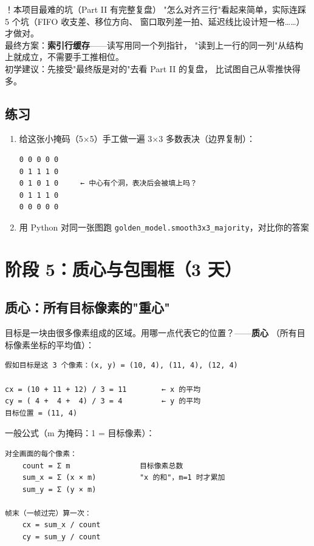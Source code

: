 \documentclass[11pt]{ctexart}
\newcommand{\code}[1]{\texttt{#1}}
\begin{document}
\begin{warnbox}{！本项目最难的坑（Part II 有完整复盘）}
"怎么对齐三行"看起来简单，实际连踩 5 个坑（FIFO 收支差、移位方向、
窗口取列差一拍、延迟线比设计短一格……）才做对。\\[4pt]
最终方案：\textbf{索引行缓存}——读写用同一个列指针，
"读到上一行的同一列"从结构上就成立，不需要手工推相位。\\[4pt]
初学建议：先接受"最终版是对的"去看 Part II 的复盘，
比试图自己从零推快得多。
\end{warnbox}

\subsection{练习}

\begin{enumerate}
  \item 给这张小掩码（5×5）手工做一遍 3×3 多数表决（边界复制）：
\begin{Verbatim}[fontsize=\small]
0 0 0 0 0
0 1 1 1 0
0 1 0 1 0     ← 中心有个洞，表决后会被填上吗？
0 1 1 1 0
0 0 0 0 0
\end{Verbatim}
  \item 用 Python 对同一张图跑 \code{golden\_model.smooth3x3\_majority}，对比你的答案
\end{enumerate}

\section{阶段 5：质心与包围框（3 天）}

\subsection{质心：所有目标像素的"重心"}

目标是一块由很多像素组成的区域。用哪一点代表它的位置？——\textbf{质心}
（所有目标像素坐标的平均值）：

\begin{Verbatim}[frame=single,fontsize=\small]
假如目标是这 3 个像素：(x, y) = (10, 4), (11, 4), (12, 4)

cx = (10 + 11 + 12) / 3 = 11        ← x 的平均
cy = ( 4 +  4 +  4) / 3 = 4         ← y 的平均
目标位置 = (11, 4)
\end{Verbatim}

一般公式（m 为掩码：1 = 目标像素）：

\begin{Verbatim}[frame=single,fontsize=\small]
对全画面的每个像素：
    count = Σ m                目标像素总数
    sum_x = Σ (x × m)          "x 的和"，m=1 时才累加
    sum_y = Σ (y × m)

帧末（一帧过完）算一次：
    cx = sum_x / count
    cy = sum_y / count
\end{Verbatim}
\end{document}
